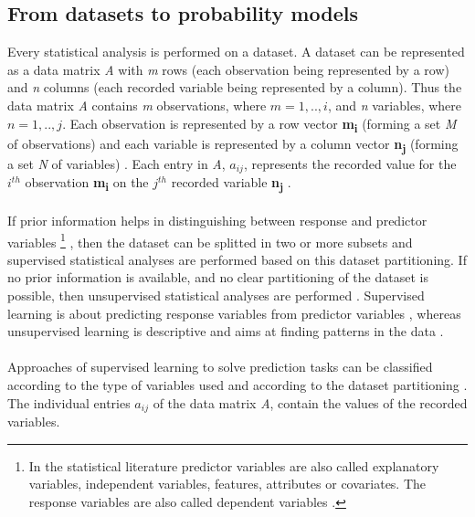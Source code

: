 \documentclass {article}
\begin{document}
\subsection{From datasets to probability models}

Every statistical analysis is performed on a dataset. 
A dataset can be represented as a data matrix \textit{A} with \textit{m} rows (each observation being represented by a row) and \textit{n} columns (each recorded variable being represented by a column). 
Thus the data matrix \textit{A} contains \textit{m} observations, where $m=1,..,i$, and \textit{n} variables, where $n=1,..,j$.
Each observation is represented by a row vector \textbf{m\textsubscript{i}} (forming a set \textit{M} of observations) and each variable is represented by a column vector \textbf{n\textsubscript{j}} (forming a set \textit{N} of variables) \cite{hastie_elements_2013}.  
 Each entry in \textit{A}, $a_{ij}$, represents the recorded value for the $i^{th}$ observation \textbf{m\textsubscript{i}} on the $j^{th}$ recorded variable \textbf{n\textsubscript{j}} \cite{quinn_experimental_2002} \cite{carroll_mathematical_1997}.
\\
\\ 
 If prior information helps in distinguishing between response and predictor variables 
\footnote{In the statistical literature predictor variables are also called explanatory variables, independent variables, features, attributes or covariates. The response variables are also called dependent variables \cite{hastie_elements_2013} \cite{murphy_machine_2012}.}
, then the dataset can be splitted in two or more subsets and supervised statistical analyses are performed based on this dataset partitioning.
 If no prior information is available, and no clear partitioning of the dataset is possible, then unsupervised statistical analyses are performed \cite{hastie_elements_2013} \cite{carroll_mathematical_1997}.  
Supervised learning is about predicting response variables from predictor variables \cite{hastie_elements_2013}, whereas unsupervised learning is descriptive and aims at finding patterns in the data \cite{murphy_machine_2012}.
\\
\\
Approaches of supervised learning to solve prediction tasks can be classified according to the type of variables used \cite{hastie_elements_2013} and according to the dataset partitioning \cite{carroll_mathematical_1997}.    
The individual entries $a_{ij}$ of the data matrix \textit{A}, contain the values of the recorded variables.
\end{document}
